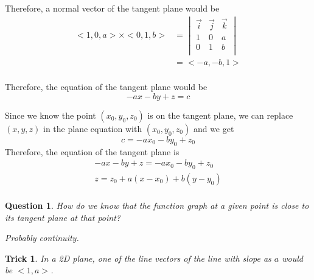 \documentclass{article}
\newtheorem{trick}{Trick}
\newtheorem{question}{Question}
\begin{document}
Therefore, a normal vector of the tangent plane would be
\begin{equation}
\begin{split}
  <1, 0, a> \times <0, 1, b>
  &= \begin{vmatrix}
       \vec{i} & \vec{j} & \vec{k} \\
       1 & 0 & a \\
       0 & 1 & b \\ 
     \end{vmatrix} \\
  &= <-a, -b, 1> \\
\end{split}
\end{equation}

Therefore, the equation of the tangent plane would be
\begin{equation*}
  -ax - by + z = c
\end{equation*}

Since we know the point $(x_0, y_0, z_0)$ is on the tangent plane, we can 
replace $(x, y, z)$ in the plane equation with $(x_0, y_0, z_0)$ and we get
\begin{equation*}
  c = -ax_0 - by_0 + z_0
\end{equation*}
Therefore, the equation of the tangent plane is 
\begin{gather*}
  -ax - by + z = -ax_0 - by_0 + z_0 \\
  z = z_0 + a(x - x_0) + b(y - y_0) \\
\end{gather*}

\begin{question}
How do we know that the function graph at a given point is close to its tangent 
plane at that point?

Probably continuity.
\end{question}

\begin{trick}
In a 2D plane, one of the line vectors of the line with slope as $a$ would be 
$<1, a>$.
\end{trick}
\end{document}

